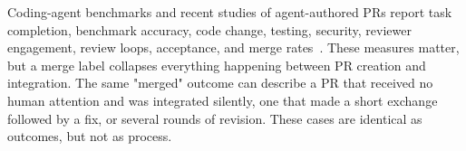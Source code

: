 \documentclass[10pt,conference,anonymous]{IEEEtran}
\begin{document}
Coding-agent benchmarks and recent studies of agent-authored PRs report task completion, benchmark accuracy, code change, testing, security, reviewer engagement, review loops, acceptance, and merge rates~\cite{wangSurveyLargeLanguage2024,liangSWEBenchIllusionWhen2025a,watanabeUseAgenticCoding2026,watanabeHowAICoding2026,popescu2026autonomous,ogenrwotHowAICoding2026,haqueAutonomousAgentsContribute2026,siddiqSecurityAgeAI2026,yoshiokaLetsMakeEvery2026,nachumaWhenAITeammates2026,gaoAutopilotEmpiricalStudy2026}.
These measures matter, but a merge label collapses everything happening between PR creation and integration.
The same "merged" outcome can describe a PR that received no human attention and was integrated silently, one that made a short exchange followed by a fix, or several rounds of revision.
These cases are identical as outcomes, but not as process.
\end{document}
